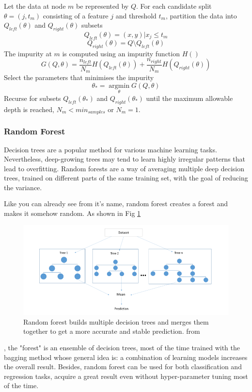 \documentclass[11pt, a4paper, leqno]{article}
\begin{document}
Let the data at node $m$ be represented by $Q$. For each candidate split $\theta =(j,t_m)$ consisting of a feature $j$ and threshold $t_m$, partition the data into $Q_{left}(\theta)$ and $Q_{right}(\theta)$ subsets
\begin{equation}
Q_{left}(\theta)=(x,y)|x_j\leq t_m
\end{equation}
\begin{equation}
Q_{right}(\theta)=Q\setminus Q_{left}(\theta)
\end{equation}
The impurity at $m$ is computed using an impurity function $H()$
\begin{equation}
G(Q,\theta)=\frac{n_{left}}{N_m}H(Q_{left}(\theta))+\frac{n_{right}}{N_m}H(Q_{right}(\theta))
\end{equation}
Select the parameters that minimises the impurity
\begin{equation}
\theta_\ast=\operatorname*{argmin}_\theta G(Q,\theta)
\end{equation}
Recurse for subsets $Q_{left}(\theta_\ast)$ and $Q_{right}(\theta_\ast)$ until the maximum allowable depth is reached, $N_m<min_{samples}$ or $N_m=1$.

\subsubsection{Random Forest}
Decision trees are a popular method for various machine learning tasks. Nevertheless, deep-growing trees may tend to learn highly irregular patterns that lead to overfitting. Random forests are a way of averaging multiple deep decision trees, trained on different parts of the same training set, with the goal of reducing the variance.

Like you can already see from it’s name, random forest creates a forest and makes it somehow random. As shown in Fig \ref{fig:Random Forest}
\begin{figure}[ht]
\centering
\includegraphics[width=0.9\columnwidth]{formulas/randomforest.png}
\caption{Random forest builds multiple decision trees and merges them together to get a more accurate and stable prediction. from \cite{Vaibhav:2018:Online}}
\label{fig:Random Forest}
\end{figure}
, the "forest" is an ensemble of decision trees, most of the time trained with the bagging method whose general idea is: a combination of learning models increases the overall result. Besides, random forest can be used for both classification and regression tasks, acquire a great result even without hyper-parameter tuning most of the time.
\end{document}

